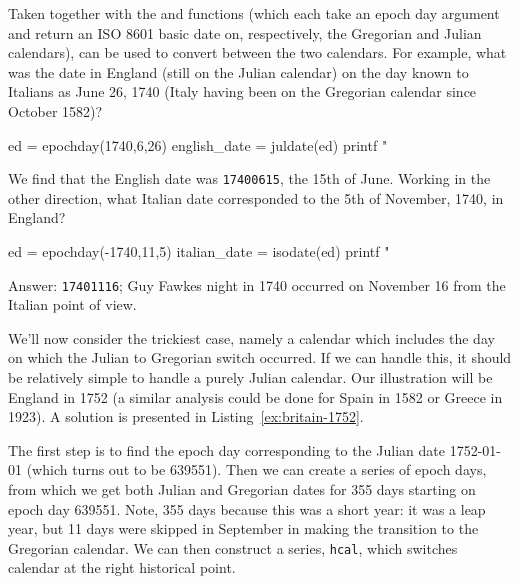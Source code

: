 Taken together with the  and 
functions (which each take an epoch day argument and return an ISO
8601 basic date on, respectively, the Gregorian and Julian calendars),
 can be used to convert between the two calendars.
For example, what was the date in England (still on the Julian
calendar) on the day known to Italians as June 26, 1740 (Italy having
been on the Gregorian calendar since October 1582)?
%
\begin{code}
ed = epochday(1740,6,26)
english_date = juldate(ed)
printf "%
\end{code}
%
We find that the English date was \texttt{17400615}, the 15th of June.
Working in the other direction, what Italian date corresponded to the
5th of November, 1740, in England?
%
\begin{code}
ed = epochday(-1740,11,5)
italian_date = isodate(ed)
printf "%
\end{code}
%
Answer: \texttt{17401116}; Guy Fawkes night in 1740 occurred on 
November 16 from the Italian point of view.

We'll now consider the trickiest case, namely a calendar which includes
the day on which the Julian to Gregorian switch occurred. If we can
handle this, it should be relatively simple to handle a purely Julian
calendar. Our illustration will be England in 1752 (a similar analysis
could be done for Spain in 1582 or Greece in 1923). A solution
is presented in Listing~\ref{ex:britain-1752}.

The first step is to find the epoch day corresponding to the Julian
date 1752-01-01 (which turns out to be 639551). Then we can create a
series of epoch days, from which we get both Julian and Gregorian
dates for 355 days starting on epoch day 639551. Note, 355 days
because this was a short year: it was a leap year, but 11 days were
skipped in September in making the transition to the Gregorian
calendar. We can then construct a series, \texttt{hcal}, which
switches calendar at the right historical point.


